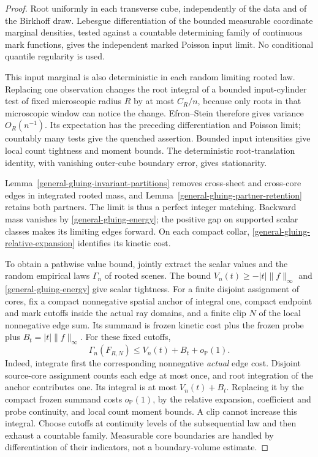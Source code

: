 \documentclass[11pt,reqno]{amsart}
\theoremstyle{definition}
\theoremstyle{remark}
\numberwithin{equation}{section}
\newcommand{\Pp}{\mathbb P}
\begin{document}
\begin{proof}
Root uniformly in each transverse cube, independently of the data and of
the Birkhoff draw. Lebesgue differentiation of the bounded measurable
coordinate marginal densities, tested against a countable determining
family of continuous mark functions, gives the independent marked Poisson
input limit. No conditional quantile regularity is used.

This input marginal is also deterministic in each random limiting rooted
law. Replacing one observation changes the root integral of a bounded
input-cylinder test of fixed microscopic radius \(R\) by at most
\(C_R/n\), because only roots in that microscopic window can notice the
change. Efron--Stein therefore gives variance \(O_R(n^{-1})\). Its
expectation has the preceding differentiation and Poisson limit; countably
many tests give the quenched assertion. Bounded input intensities give
local count tightness and moment bounds. The deterministic root-translation
identity, with vanishing outer-cube boundary error, gives stationarity.

Lemma~\ref{general-gluing-invariant-partitions} removes cross-sheet and
cross-core edges in integrated rooted mass, and
Lemma~\ref{general-gluing-partner-retention} retains both partners. The
limit is thus a perfect integer matching. Backward mass vanishes by
\eqref{general-gluing-energy}; the positive gap on supported scalar
classes makes its limiting edges forward. On each compact collar,
\eqref{general-gluing-relative-expansion} identifies its kinetic cost.

To obtain a pathwise value bound, jointly extract the scalar values and
the random empirical laws \(\Gamma_n\) of rooted scenes. The bound
\(V_n(t)\ge-|t|\|f\|_\infty\) and
\eqref{general-gluing-energy} give scalar tightness. For a finite disjoint
assignment of cores, fix a compact nonnegative spatial anchor of integral
one, compact endpoint and mark cutoffs inside the actual ray domains, and
a finite clip \(N\) of the local nonnegative edge sum. Its summand is
frozen kinetic cost plus the frozen probe plus
\(B_t=|t|\|f\|_\infty\). For these fixed cutoffs,
\begin{equation}
\label{general-gluing-finite-domination}
 \Gamma_n(F_{R,N})\le V_n(t)+B_t+o_{\Pp}(1).
\end{equation}
Indeed, integrate first the corresponding nonnegative \emph{actual} edge
cost. Disjoint source-core assignment counts each edge at most once,
and root integration of the anchor contributes one. Its integral is at
most \(V_n(t)+B_t\). Replacing it by the compact frozen summand costs
\(o_{\Pp}(1)\), by the relative expansion, coefficient and probe
continuity, and local count moment bounds. A clip cannot increase this
integral. Choose cutoffs at continuity levels of the subsequential law and
then exhaust a countable family. Measurable core boundaries are handled
by differentiation of their indicators, not a boundary-volume estimate.


\end{proof}
\end{document}

